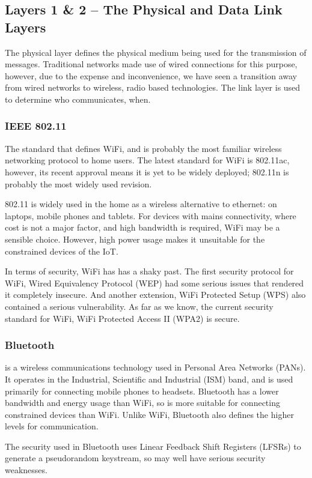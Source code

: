 \documentclass[journal]{IEEEtran}
\begin{document}
\subsection{Layers 1 \& 2 -- The Physical and Data Link Layers}
The physical layer defines the physical medium being used for the transmission
of messages. Traditional networks made use of wired connections for this
purpose, however, due to the expense and inconvenience, we have seen a
transition away from wired networks to wireless, radio based technologies. The
link layer is used to determine who communicates, when.

\subsubsection{IEEE 802.11}
The standard that defines WiFi, and is probably the most
familiar wireless networking protocol to home users. The latest standard for
WiFi is 802.11ac, however, its recent approval means it is yet to be widely
deployed; 802.11n is probably the most widely used revision. 

802.11 is widely used in the home as a wireless alternative to ethernet: on
laptops, mobile phones and tablets. For devices with mains connectivity, where
cost is not a major factor, and high bandwidth is required, WiFi may be a
sensible choice.  However, high power usage makes it unsuitable for the
constrained devices of the IoT. 

In terms of security, WiFi has has a shaky past. The first security protocol
for WiFi, Wired Equivalency Protocol (WEP) had some serious issues that
rendered it completely insecure. And another extension, WiFi Protected
Setup (WPS) also contained a serious vulnerability. As far as we know, the
current security standard for WiFi, WiFi Protected Access II (WPA2) is
secure. 

\subsubsection{Bluetooth}
is a wireless communications technology used in Personal Area Networks (PANs).
It operates in the Industrial, Scientific and Industrial (ISM) band, and is
used primarily for connecting mobile phones to headsets. Bluetooth has a lower
bandwidth and energy usage than WiFi, so is more suitable for connecting
constrained devices than WiFi. Unlike WiFi, Bluetooth also defines the higher
levels for communication. 

The security used in Bluetooth uses Linear Feedback Shift Registers (LFSRs) to
generate a pseudorandom keystream, so may well have serious security
weaknesses.
\end{document}
